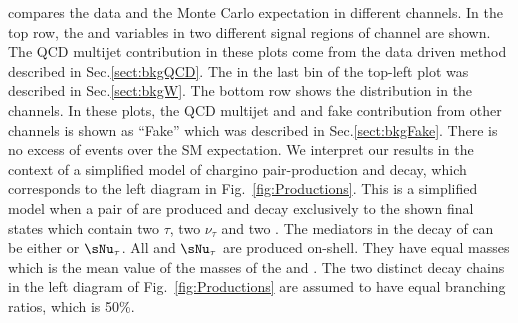 compares the data and the Monte Carlo expectation in different channels. In the top row, the \mttwo and \SumMT variables in two 
different signal regions of \tauTau channel are shown. The QCD multijet contribution in these plots come from the data driven method described in 
Sec.\ref{sect:bkgQCD}. The \wjets in the last bin of the top-left plot was described in Sec.\ref{sect:bkgW}. The bottom row shows the \mttwo
distribution in the \leptonTau channels. In these plots, the QCD multijet and \wjets and fake contribution from other channels is shown 
as ``Fake'' which was described in Sec.\ref{sect:bkgFake}.
There is no excess of events over the SM expectation.  We interpret our results in the context
of a simplified model of chargino pair-production and decay, which corresponds to the left
diagram in Fig.~\ref{fig:Productions}. This is a simplified model when a pair of \chione 
are produced and decay exclusively to the shown final states which contain two $\tau$, two $\nu_{\tau}$ and two \PSGczDo.
The mediators in the decay of \chione can be either \sTau or $\sNu_{\tau}$. All  \sTau and $\sNu_{\tau}$ 
are produced  on-shell. They have equal masses which is the mean value of the masses of the \chione   and \PSGczDo.
The two distinct decay chains in the left diagram of Fig.~\ref{fig:Productions} are assumed to have equal branching ratios, which is 50\%.



